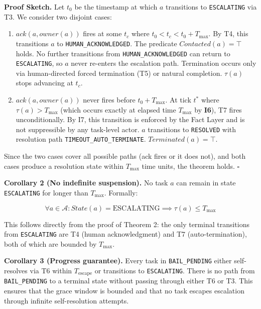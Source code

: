 \bigskip
\noindent\textbf{Proof Sketch.} Let $t_0$ be the timestamp at which $a$ transitions to \texttt{ESCALATING} via T3. We consider two disjoint cases:

\begin{enumerate}
\item[\textbf{Case 1}] $ack(a, owner(a))$ fires at some $t_c$ where $t_0 < t_c < t_0 + T_\text{max}$. By T4, this transitions $a$ to \texttt{HUMAN\_ACKNOWLEDGED}. The predicate $Contacted(a) = \top$ holds. No further transitions from \texttt{HUMAN\_ACKNOWLEDGED} can return to \texttt{ESCALATING}, so $a$ never re-enters the escalation path. Termination occurs only via human-directed forced termination (T5) or natural completion. $\tau(a)$ stops advancing at $t_c$.

\item[\textbf{Case 2}] $ack(a, owner(a))$ never fires before $t_0 + T_\text{max}$. At tick $t^*$ where $\tau(a) > T_\text{max}$ (which occurs exactly at elapsed time $T_\text{max}$ by \textbf{I6}), T7 fires unconditionally. By I7, this transition is enforced by the Fact Layer and is not suppressible by any task-level actor. $a$ transitions to \texttt{RESOLVED} with resolution path \texttt{TIMEOUT\_AUTO\_TERMINATE}. $Terminated(a) = \top$.
\end{enumerate}

Since the two cases cover all possible paths (ack fires or it does not), and both cases produce a resolution state within $T_\text{max}$ time units, the theorem holds. $\square$

\bigskip
\noindent\textbf{Corollary 2 (No indefinite suspension).} No task $a$ can remain in state \texttt{ESCALATING} for longer than $T_\text{max}$. Formally:

\[
\forall a \in \mathcal{A}: State(a) = \text{ESCALATING} \implies \tau(a) \leq T_\text{max}
\]

This follows directly from the proof of Theorem 2: the only terminal transitions from \texttt{ESCALATING} are T4 (human acknowledgment) and T7 (auto-termination), both of which are bounded by $T_\text{max}$.

\bigskip
\noindent\textbf{Corollary 3 (Progress guarantee).} Every task in \texttt{BAIL\_PENDING} either self-resolves via T6 within $T_\text{escape}$ or transitions to \texttt{ESCALATING}. There is no path from \texttt{BAIL\_PENDING} to a terminal state without passing through either T6 or T3. This ensures that the grace window is bounded and that no task escapes escalation through infinite self-resolution attempts.

